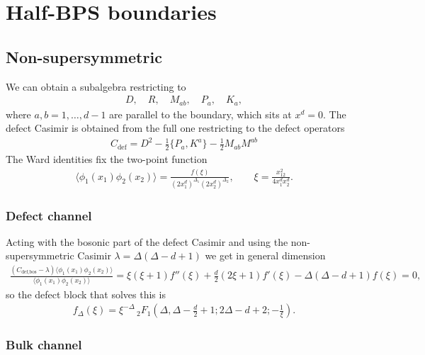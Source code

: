 \documentclass[letterpaper]{article}
\let\Oldsection\section
\renewcommand{\section}{\FloatBarrier\Oldsection}
\let\Oldsubsection\subsection
\renewcommand{\subsection}{\FloatBarrier\Oldsubsection}
\let\Oldsubsubsection\subsubsection
\renewcommand{\subsubsection}{\FloatBarrier\Oldsubsubsection}
\begin{document}
\section{Half-BPS boundaries}

\subsection{Non-supersymmetric}

We can obtain a subalgebra restricting to
\begin{align}
 D, \quad
 R, \quad
 M_{ab}, \quad
 P_{a}, \quad
 K_{a},
\end{align}
where $a,b = 1, \ldots, d-1$ are parallel to the boundary, which sits at $x^d = 0$.
The defect Casimir is obtained from the full one restricting to the defect operators
\begin{align}
 C_{\text{def}} = 
    D^2
  - \frac12 \{ P_{a}, K^{a} \}
  - \frac{1}{2} M_{ab} M^{ab}
\end{align}
The Ward identities fix the two-point function
\begin{align}
 \langle \phi_1(x_1) \phi_2(x_2) \rangle
 = \frac{f(\xi)}{(2x_1^d)^{\Delta_1} (2x_2^d)^{\Delta_2}}, \qquad
 \xi = \frac{x_{12}^2}{4 x_1^{d} x_2^{d}}.
\end{align}

\subsubsection{Defect channel}

Acting with the bosonic part of the defect Casimir and using the non-supersymmetric Casimir $\lambda = \Delta(\Delta - d + 1)$ we get in general dimension
\begin{align}
 \frac{
 \left( C_{\text{def,bos}} - \lambda \right) \langle \phi_1(x_1) \phi_2(x_2)\rangle
 }{\langle \phi_1(x_1) \phi_2(x_2)\rangle}
 = \xi  (\xi +1) f''(\xi ) 
 + \frac{d}{2} (2 \xi +1) f'(\xi )
 - \Delta (\Delta - d + 1) f(\xi )
 = 0,
\end{align}
so the defect block that solves this is
\begin{align}
 f_\Delta(\xi) =
 \xi ^{-\Delta } \, _2F_1\left(\Delta ,\Delta-\frac{d}{2} + 1;2 \Delta -d + 2; -\frac{1}{\xi }\right).
\end{align}

\subsubsection{Bulk channel}
\end{document}
